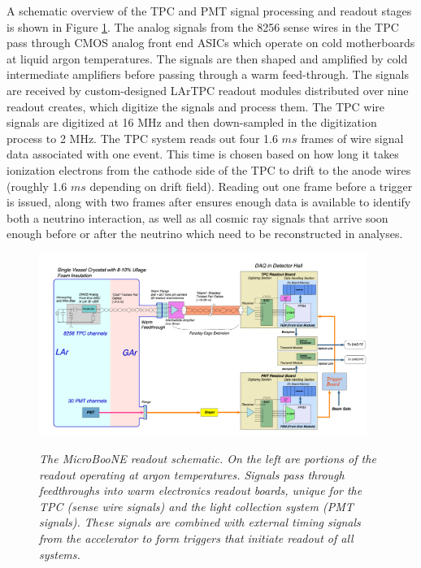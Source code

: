 A schematic overview of the TPC and PMT signal processing and readout stages is shown in Figure \ref{readout_scheme_fig}. The analog signals from the 8256 sense wires in the TPC pass through CMOS analog front end ASICs which operate on cold motherboards at liquid argon temperatures. The signals are then shaped and amplified by cold intermediate amplifiers before passing through a warm feed-through. The signals are received by custom-designed LArTPC readout modules distributed over nine readout creates, which digitize the signals and process them. The TPC wire signals are digitized at 16 MHz and then down-sampled in the digitization process to 2 MHz. The TPC system reads out four 1.6 $ms$ frames of wire signal data associated with one event. This time is chosen based on how long it takes ionization electrons from the cathode side of the TPC to drift to the anode wires (roughly 1.6 $ms$ depending on drift field). Reading out one frame before a trigger is issued, along with two frames after ensures enough data is available to identify both a neutrino interaction, as well as all cosmic ray signals that arrive soon enough before or after the neutrino which need to be reconstructed in analyses.\\

\begin{figure}[ht!]
\centering
    \includegraphics[width=0.95\textwidth]{Figures/UB_readout_scheme.png} \\
\caption{\textit{The MicroBooNE readout schematic. On the left are portions of the readout operating at argon temperatures. Signals pass through feedthroughs into warm electronics readout boards, unique for the TPC (sense wire signals) and the light collection system (PMT signals). These signals are combined with external timing signals from the accelerator to form triggers that initiate readout of all systems.}}\label{readout_scheme_fig}
\end{figure}

